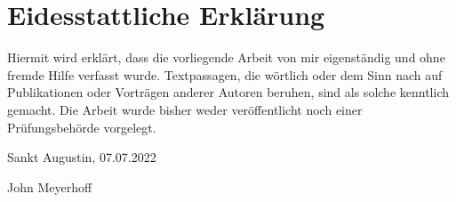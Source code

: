 \section*{Eidesstattliche Erklärung}

Hiermit wird erklärt, dass die vorliegende Arbeit von mir eigenständig und ohne fremde
Hilfe verfasst wurde. Textpassagen, die wörtlich oder dem Sinn nach auf Publikationen
oder Vorträgen anderer Autoren beruhen, sind als solche kenntlich gemacht.
Die Arbeit wurde bisher weder veröffentlicht noch einer Prüfungsbehörde vorgelegt.

Sankt Augustin, 07.07.2022


\vspace*{50px}
John Meyerhoff
\hrulefill

